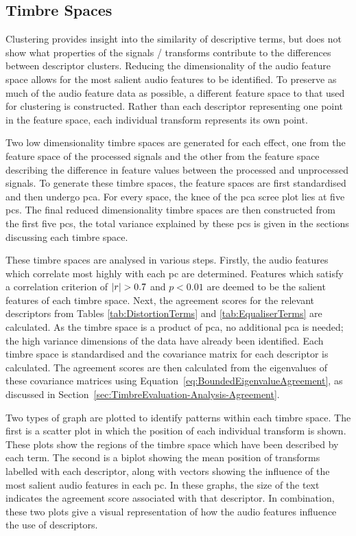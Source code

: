 	\subsection{Timbre Spaces}
	\label{sec:TimbreEvaluation-Analysis-TimbreSpaces}
		Clustering provides insight into the similarity of descriptive terms, but does not show what properties of
		the signals / transforms contribute to the differences between descriptor clusters. Reducing the
		dimensionality of the audio feature space allows for the most salient audio features to be identified. To
		preserve as much of the audio feature data as possible, a different feature space to that used for
		clustering is constructed. Rather than each descriptor representing one point in the feature space, each
		individual transform represents its own point. 

		Two low dimensionality timbre spaces are generated for each effect, one from the feature space of the
		processed signals and the other from the feature space describing the difference in feature values between
		the processed and unprocessed signals. To generate these timbre spaces, the feature spaces are first
		standardised and then undergo \acrshort{pca}. For every space, the knee of the \acrshort{pca} scree plot
		lies at five \acrshort{pc}s. The final reduced dimensionality timbre spaces are then constructed from the
		first five \acrshort{pc}s, the total variance explained by these \acrshort{pc}s is given in the sections
		discussing each timbre space.

		These timbre spaces are analysed in various steps. Firstly, the audio features which correlate most highly
		with each \acrshort{pc} are determined. Features which satisfy a correlation criterion of $\left|r\right| > 0.7$
		and $p < 0.01$ are deemed to be the salient features of each timbre space. Next, the agreement scores for
		the relevant descriptors from Tables \ref{tab:DistortionTerms} and \ref{tab:EqualiserTerms} are calculated.
		As the timbre space is a product of \acrshort{pca}, no additional \acrshort{pca} is needed; the high
		variance dimensions of the data have already been identified. Each timbre space is standardised and the
		covariance matrix for each descriptor is calculated. The agreement scores are then calculated from the
		eigenvalues of these covariance matrices using Equation~\ref{eq:BoundedEigenvalueAgreement}, as discussed
		in Section~\ref{sec:TimbreEvaluation-Analysis-Agreement}.
		
		Two types of graph are plotted to identify patterns within each timbre space. The first is a scatter plot
		in which the position of each individual transform is shown. These plots show the regions of the timbre
		space which have been described by each term. The second is a biplot showing the mean position of
		transforms labelled with each descriptor, along with vectors showing the influence of the most salient
		audio features in each \acrshort{pc}. In these graphs, the size of the text indicates the agreement score
		associated with that descriptor. In combination, these two plots give a visual representation of how the
		audio features influence the use of descriptors.

